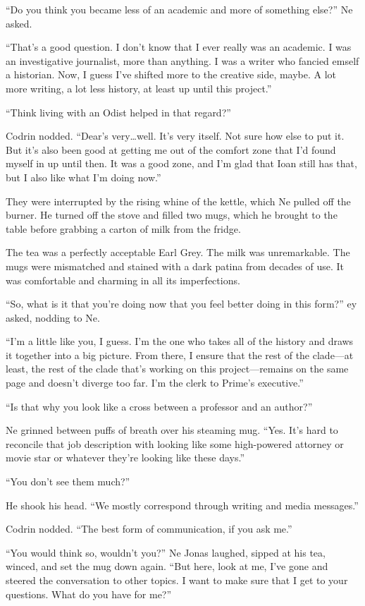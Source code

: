 ``Do you think you became less of an academic and more of something else?'' Ne asked.

``That's a good question. I don't know that I ever really was an academic. I was an investigative journalist, more than anything. I was a writer who fancied emself a historian. Now, I guess I've shifted more to the creative side, maybe. A lot more writing, a lot less history, at least up until this project.''

``Think living with an Odist helped in that regard?''

Codrin nodded. ``Dear's very\ldots well. It's very itself. Not sure how else to put it. But it's also been good at getting me out of the comfort zone that I'd found myself in up until then. It was a good zone, and I'm glad that Ioan still has that, but I also like what I'm doing now.''

They were interrupted by the rising whine of the kettle, which Ne pulled off the burner. He turned off the stove and filled two mugs, which he brought to the table before grabbing a carton of milk from the fridge.

The tea was a perfectly acceptable Earl Grey. The milk was unremarkable. The mugs were mismatched and stained with a dark patina from decades of use. It was comfortable and charming in all its imperfections.

``So, what is it that you're doing now that you feel better doing in this form?'' ey asked, nodding to Ne.

``I'm a little like you, I guess. I'm the one who takes all of the history and draws it together into a big picture. From there, I ensure that the rest of the clade---at least, the rest of the clade that's working on this project---remains on the same page and doesn't diverge too far. I'm the clerk to Prime's executive.''

``Is that why you look like a cross between a professor and an author?''

Ne grinned between puffs of breath over his steaming mug. ``Yes. It's hard to reconcile that job description with looking like some high-powered attorney or movie star or whatever they're looking like these days.''

``You don't see them much?''

He shook his head. ``We mostly correspond through writing and media messages.''

Codrin nodded. ``The best form of communication, if you ask me.''

``You would think so, wouldn't you?'' Ne Jonas laughed, sipped at his tea, winced, and set the mug down again. ``But here, look at me, I've gone and steered the conversation to other topics. I want to make sure that I get to your questions. What do you have for me?''

